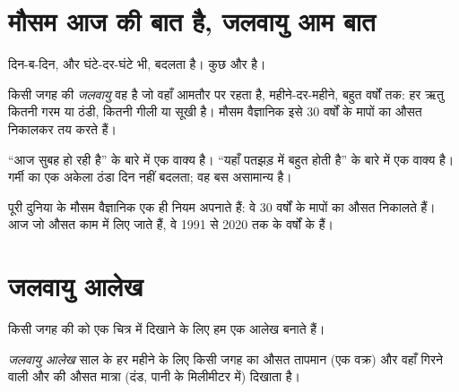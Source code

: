 \section{मौसम आज की बात है, जलवायु आम बात}

 दिन-ब-दिन, और घंटे-दर-घंटे भी, बदलता है।  कुछ और
है।

\begin{definition}[जलवायु]\label{def:g5:weather-and-climate:climate}
किसी जगह की \emph{जलवायु} वह  है जो वहाँ आमतौर पर रहता है,
महीने-दर-महीने, बहुत वर्षों तक: हर ऋतु कितनी गरम या ठंडी, कितनी गीली या सूखी
है। मौसम वैज्ञानिक इसे 30 वर्षों के मापों का औसत निकालकर
तय करते हैं।
\end{definition}

``आज सुबह  हो रही है''  के बारे में एक वाक्य है। ``यहाँ पतझड़ में बहुत
 होती है''  के बारे में एक वाक्य है। गर्मी का एक अकेला ठंडा दिन 
नहीं बदलता; वह बस असामान्य  है।

पूरी दुनिया के मौसम वैज्ञानिक एक ही नियम अपनाते हैं: वे 30 वर्षों के मापों का औसत
निकालते हैं। आज जो औसत काम में लिए जाते हैं, वे 1991 से 2020 तक के वर्षों
के हैं।

\section{जलवायु आलेख}

किसी जगह की  को एक चित्र में दिखाने के लिए हम एक आलेख बनाते हैं।

\begin{definition}[जलवायु आलेख]\label{def:g5:weather-and-climate:climate-chart}
\emph{जलवायु आलेख} साल के हर महीने के लिए किसी जगह का औसत
तापमान (एक वक्र) और वहाँ गिरने वाली  और  की औसत मात्रा (दंड, पानी के
मिलीमीटर में) दिखाता है।
\end{definition}

